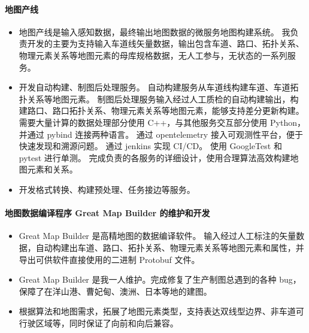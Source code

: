     \paragraph{地图产线}
        \begin{itemize}
            \item 
                地图产线是输入感知数据，最终输出地图数据的微服务地图构建系统。
                我负责开发的主要为支持输入车道线矢量数据，输出包含车道、路口、拓扑关系、物理元素关系等地图元素的母库规格数据，无人工参与，无状态的一系列服务。
            \item 
                开发自动构建、制图后处理服务。
                自动构建服务从车道线构建车道、车道拓扑关系等地图元素。
                制图后处理服务输入经过人工质检的自动构建输出，构建路口、路口拓扑关系、物理元素关系等地图元素，能够支持差分更新构建。
                需要大量计算的数据处理部分使用 C++，与其他服务交互部分使用 Python，并通过 pybind 连接两种语言。
                通过 opentelemetry 接入可观测性平台，便于快速发现和溯源问题。
                通过 jenkins 实现 CI/CD。
                使用 GoogleTest 和 pytest 进行单测。
                完成负责的各服务的详细设计，使用合理算法高效构建地图元素和关系。
            \item 
                开发格式转换、构建预处理、任务接边等服务。
        \end{itemize}

    \paragraph{地图数据编译程序 Great Map Builder 的维护和开发}
        \begin{itemize}
            \item 
                Great Map Builder 是高精地图的数据编译软件。
                输入经过人工标注的矢量数据，自动构建出车道、路口、拓扑关系、物理元素关系等地图元素和属性，并导出可供软件直接使用的二进制 Protobuf 文件。
            \item 
                Great Map Builder 是我一人维护。完成修复了生产制图总遇到的各种 bug，保障了在洋山港、曹妃甸、澳洲、日本等地的建图。
            \item 
                根据算法和地图需求，拓展了地图元素类型，支持表达双线型边界、非车道可行驶区域等，同时保证了向前和向后兼容。
        \end{itemize}

